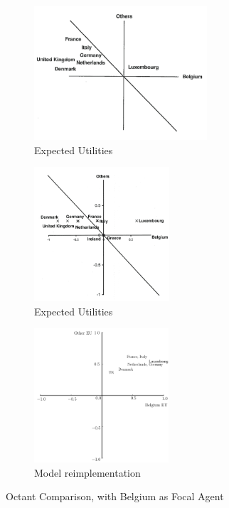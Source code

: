 \begin{figure}
    \centering
    \begin{subfigure}{0.32\textwidth}
        \includegraphics[height=5cm]{BDM_Reproduction/Figures/Octants_BDM94}
        \caption{\citet{bdm_1994} Expected Utilities}
    \end{subfigure}
    \begin{subfigure}{0.32\textwidth}
        \includegraphics[height=5cm]{BDM_Reproduction/Figures/Octants_Scholz11}
        \caption{\citet{scholz_2011} Expected Utilities}
    \end{subfigure}
    \begin{subfigure}{0.32\textwidth}
        \includegraphics[height=5cm]{BDM_Reproduction/Figures/OctantComparison}
        \caption{Model reimplementation}
    \end{subfigure}

    \caption[Octant Comparison]{Octant Comparison, with Belgium as Focal Agent}
    \label{fig:octant_comparison}
    \figSpace

\end{figure}

